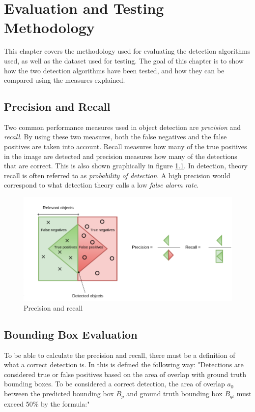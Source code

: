 
\chapter{Evaluation and Testing Methodology}
\label{sec:eval}
This chapter covers the methodology used for evaluating the detection algorithms used, as well as the dataset used for testing. The goal of this chapter is to show how the two detection algorithms have been tested, and how they can be compared using the measures explained.

\section{Precision and Recall}
\label{sec:prec_rec}

Two common performance measures used in object detection are \textit{precision} and \textit{recall}. By using these two measures, both the false negatives and the false positives are taken into account. Recall measures how many of the true positives in the image are detected and precision measures how many of the detections that are correct. This is also shown graphically in figure \ref{fig:prec_recall}. In detection, theory recall is often referred to as \textit{probability of detection}. A high precision would correspond to what detection theory calls a low \textit{false alarm rate}.

\begin{figure}[h!]
    \centering
    \includegraphics[scale=0.33]{fig/recall_precision.png}
    \caption{Precision and recall}
    \label{fig:prec_recall}
\end{figure}


\newpage

\section{Bounding Box Evaluation}
To be able to calculate the precision and recall, there must be a definition of what a correct detection is. In \citep{Everinghama} this is defined the following way: "Detections are considered true or false positives based on the area of overlap
with ground truth bounding boxes. To be considered a correct detection, the area of overlap $a_0$ between the predicted bounding box $B_p$ and ground truth bounding box $B_{gt}$ must exceed 50\% by the formula:"

